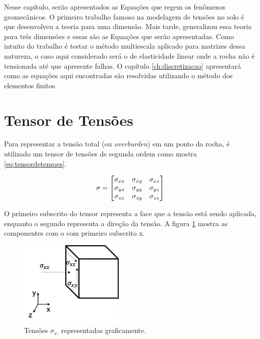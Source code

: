 Nesse capítulo, serão apresentados as Equações que regem os fenômenos geomecânicos. O primeiro trabalho famoso na modelagem de tensões no solo é \citet{Terzaghi} que desenvolveu a teoria para uma dimensão. Mais tarde, \citet{Biot} generalizou essa teoria para três dimensões e essas são as Equações que serão apresentadas. Como intuito do trabalho é testar o método multiescala aplicado para matrizes dessa natureza, o caso aqui considerado será o de elasticidade linear onde a rocha não é tensionada até que apresente falhas. O capítulo \ref{ch:discretizacao} apresentará como as equações aqui encontradas são resolvidas utilizando o método dos elementos finitos.



\section{Tensor de Tensões}

Para representar a tensão total (ou \textit{overburden}) em um ponto da rocha, é utilizado um tensor de tensões de segunda ordem como mostra \eqref{eq:tensordetensoes}.

\begin{equation} \label{eq:tensordetensoes}
\mathbf{\sigma} =
    \begin{bmatrix}
    \sigma_{xx} & \sigma_{xy} & \sigma_{xz} \\
    \sigma_{yx} & \sigma_{yy} & \sigma_{yz} \\
    \sigma_{zx} & \sigma_{zy} & \sigma_{zz}
    \end{bmatrix}
\end{equation}

O primeiro subscrito do tensor representa a face que a tensão está sendo aplicada, enquanto o segundo representa a direção da tensão. A figura \ref{fig:tensoesx} mostra as componentes com o com primeiro subscrito x.


\begin{figure}[!htbp]
\centering
\includegraphics[width=5cm]{chap01/figs/tensor.png}
\caption{Tensões $\sigma_{x.}$ representadas graficamente.}
\label{fig:tensoesx}
\end{figure}

